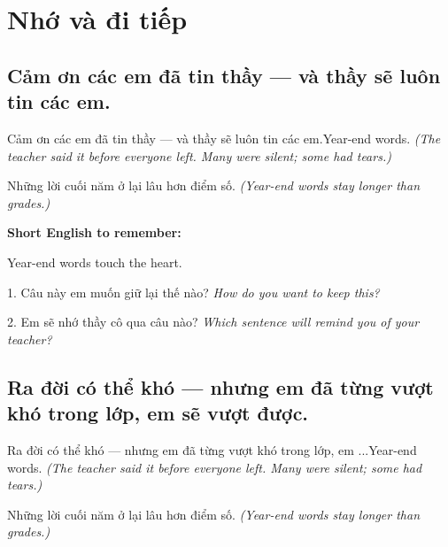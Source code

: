 \chapter{Nhớ và đi tiếp}


\section{Cảm ơn các em đã tin thầy — và thầy sẽ luôn tin các em.}
\begin{truyen}{Cảm ơn các em đã tin thầy — và thầy sẽ luôn tin các em.}{Year-end words.}
\textit{(The teacher said it before everyone left. Many were silent; some had tears.)}
\end{truyen}

\begin{baihoc}
Những lời cuối năm ở lại lâu hơn điểm số.
\textit{(Year-end words stay longer than grades.)}
\end{baihoc}

\begin{ghinhoanh}
\textbf{Short English to remember:}

Year-end words touch the heart.

\end{ghinhoanh}

\begin{tuhocnhanh}
1. Câu này em muốn giữ lại thế nào? \textit{How do you want to keep this?}

2. Em sẽ nhớ thầy cô qua câu nào? \textit{Which sentence will remind you of your teacher?}
\end{tuhocnhanh}
\ngancach


\section{Ra đời có thể khó — nhưng em đã từng vượt khó trong lớp, em sẽ vượt được.}
\begin{truyen}{Ra đời có thể khó — nhưng em đã từng vượt khó trong lớp, em ...}{Year-end words.}
\textit{(The teacher said it before everyone left. Many were silent; some had tears.)}
\end{truyen}

\begin{baihoc}
Những lời cuối năm ở lại lâu hơn điểm số.
\textit{(Year-end words stay longer than grades.)}
\end{baihoc}

